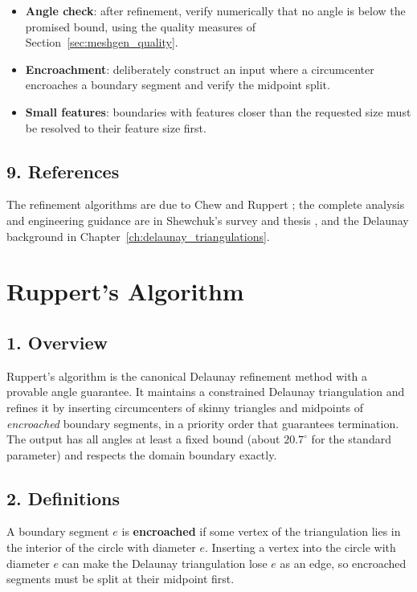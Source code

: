 \begin{itemize}
\item \textbf{Angle check}: after refinement, verify numerically that no
  angle is below the promised bound, using the quality measures of
  Section~\ref{sec:meshgen_quality}.
\item \textbf{Encroachment}: deliberately construct an input where a
  circumcenter encroaches a boundary segment and verify the midpoint split.
\item \textbf{Small features}: boundaries with features closer than the
  requested size must be resolved to their feature size first.
\end{itemize}

\subsection{9. References}

The refinement algorithms are due to Chew \cite{chew1989} and Ruppert
\cite{ruppert1995}; the complete analysis and engineering guidance are in
Shewchuk's survey \cite{shewchuk2002} and thesis \cite{shewchuk1998}, and
the Delaunay background in Chapter~\ref{ch:delaunay_triangulations}.

\section{Ruppert's Algorithm}
\label{sec:meshgen_ruppert}

\subsection{1. Overview}

Ruppert's algorithm \cite{ruppert1995} is the canonical Delaunay refinement
method with a provable angle guarantee. It maintains a constrained Delaunay
triangulation and refines it by inserting circumcenters of skinny triangles
and midpoints of \emph{encroached} boundary segments, in a priority order
that guarantees termination. The output has all angles at least a fixed
bound (about $20.7^\circ$ for the standard parameter) and respects the
domain boundary exactly.

\subsection{2. Definitions}

\begin{definition}[Encroachment]\label{def:meshgen_encroachment}
  A boundary segment $e$ is \textbf{encroached} if some vertex of the
  triangulation lies in the interior of the circle with diameter $e$.
  Inserting a vertex into the circle with diameter $e$ can make the Delaunay
  triangulation lose $e$ as an edge, so encroached segments must be split at
  their midpoint first.
\end{definition}

